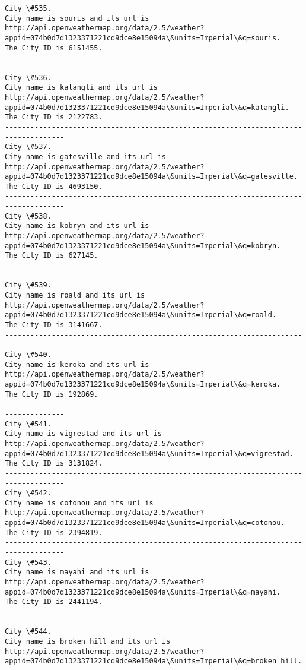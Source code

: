 \documentclass[11pt]{article}
\begin{document}
\begin{Verbatim}[commandchars=\\\{\}]
City \#535.
City name is souris and its url is http://api.openweathermap.org/data/2.5/weather?appid=074b0d7d1323371221cd9dce8e15094a\&units=Imperial\&q=souris.
The City ID is 6151455.
------------------------------------------------------------------------------------
City \#536.
City name is katangli and its url is http://api.openweathermap.org/data/2.5/weather?appid=074b0d7d1323371221cd9dce8e15094a\&units=Imperial\&q=katangli.
The City ID is 2122783.
------------------------------------------------------------------------------------
City \#537.
City name is gatesville and its url is http://api.openweathermap.org/data/2.5/weather?appid=074b0d7d1323371221cd9dce8e15094a\&units=Imperial\&q=gatesville.
The City ID is 4693150.
------------------------------------------------------------------------------------
City \#538.
City name is kobryn and its url is http://api.openweathermap.org/data/2.5/weather?appid=074b0d7d1323371221cd9dce8e15094a\&units=Imperial\&q=kobryn.
The City ID is 627145.
------------------------------------------------------------------------------------
City \#539.
City name is roald and its url is http://api.openweathermap.org/data/2.5/weather?appid=074b0d7d1323371221cd9dce8e15094a\&units=Imperial\&q=roald.
The City ID is 3141667.
------------------------------------------------------------------------------------
City \#540.
City name is keroka and its url is http://api.openweathermap.org/data/2.5/weather?appid=074b0d7d1323371221cd9dce8e15094a\&units=Imperial\&q=keroka.
The City ID is 192869.
------------------------------------------------------------------------------------
City \#541.
City name is vigrestad and its url is http://api.openweathermap.org/data/2.5/weather?appid=074b0d7d1323371221cd9dce8e15094a\&units=Imperial\&q=vigrestad.
The City ID is 3131824.
------------------------------------------------------------------------------------
City \#542.
City name is cotonou and its url is http://api.openweathermap.org/data/2.5/weather?appid=074b0d7d1323371221cd9dce8e15094a\&units=Imperial\&q=cotonou.
The City ID is 2394819.
------------------------------------------------------------------------------------
City \#543.
City name is mayahi and its url is http://api.openweathermap.org/data/2.5/weather?appid=074b0d7d1323371221cd9dce8e15094a\&units=Imperial\&q=mayahi.
The City ID is 2441194.
------------------------------------------------------------------------------------
City \#544.
City name is broken hill and its url is http://api.openweathermap.org/data/2.5/weather?appid=074b0d7d1323371221cd9dce8e15094a\&units=Imperial\&q=broken hill.

\end{Verbatim}
\end{document}
